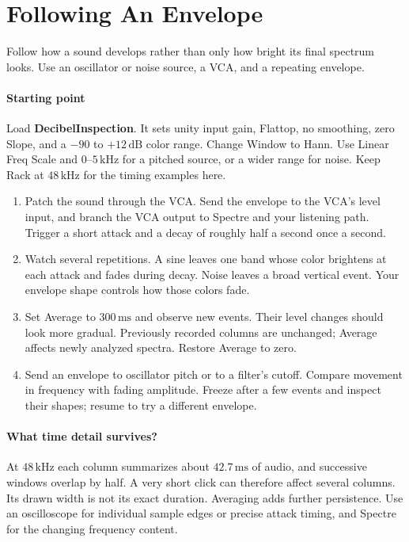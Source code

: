 \clearpage
\section{Following An Envelope}\label{sec:envelope}

Follow how a sound develops rather than only how bright its final spectrum
looks. Use an oscillator or noise source, a VCA, and a repeating envelope.

\paragraph{Starting point}
Load \textbf{DecibelInspection}. It sets unity input gain, Flattop, no
smoothing, zero Slope, and a $-90$ to $+12\,\mathrm{dB}$ color range.
Change Window to Hann. Use Linear Freq Scale and $0$--$5\,\mathrm{kHz}$
for a pitched source, or a wider range for noise. Keep Rack at
$48\,\mathrm{kHz}$ for the timing examples here.

\begin{enumerate}
  \item Patch the sound through the VCA. Send the envelope to the VCA's
  level input, and branch the VCA output to Spectre and your listening path.
  Trigger a short attack and a decay of roughly half a second once a second.
  \item Watch several repetitions. A sine leaves one band whose color
  brightens at each attack and fades during decay. Noise leaves a broad
  vertical event. Your envelope shape controls how those colors fade.
  \item Set Average to $300\,\mathrm{ms}$ and observe new events. Their
  level changes should look more gradual. Previously recorded columns are
  unchanged; Average affects newly analyzed spectra. Restore Average to zero.
  \item Send an envelope to oscillator pitch or to a filter's cutoff.
  Compare movement in frequency with fading amplitude. Freeze after a few
  events and inspect their shapes; resume to try a different envelope.
\end{enumerate}

\paragraph{What time detail survives?}
At $48\,\mathrm{kHz}$ each column summarizes about $42.7\,\mathrm{ms}$
of audio, and successive windows overlap by half. A very short click can
therefore affect several columns. Its drawn width is not its exact duration.
Averaging adds further persistence. Use an oscilloscope for individual sample
edges or precise attack timing, and Spectre for the changing frequency content.


